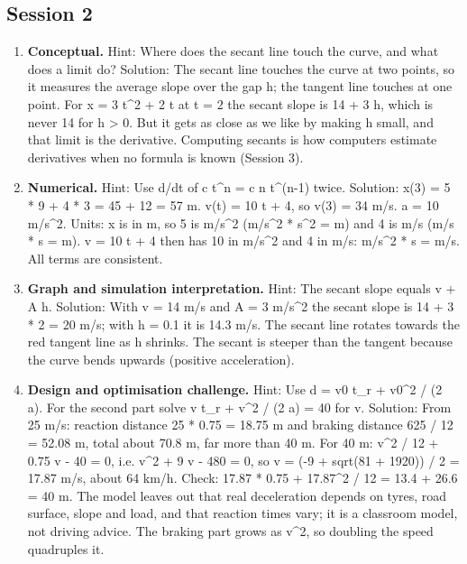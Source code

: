 \documentclass[11pt,a4paper]{article}
\begin{document}
\subsection*{Session 2}
\begin{enumerate}[nosep]
\item \textbf{Conceptual.} Hint: Where does the secant line touch the curve, and what does a limit do? Solution: The secant line touches the curve at two points, so it measures the average slope over the gap h; the tangent line touches at one point. For x = 3 t\textasciicircum{}2 + 2 t at t = 2 the secant slope is 14 + 3 h, which is never 14 for h \textgreater{} 0. But it gets as close as we like by making h small, and that limit is the derivative. Computing secants is how computers estimate derivatives when no formula is known (Session 3).
\item \textbf{Numerical.} Hint: Use d/dt of c t\textasciicircum{}n = c n t\textasciicircum{}(n-1) twice. Solution: x(3) = 5 * 9 + 4 * 3 = 45 + 12 = 57 m. v(t) = 10 t + 4, so v(3) = 34 m/s. a = 10 m/s\textasciicircum{}2. Units: x is in m, so 5 is m/s\textasciicircum{}2 (m/s\textasciicircum{}2 * s\textasciicircum{}2 = m) and 4 is m/s (m/s * s = m). v = 10 t + 4 then has 10 in m/s\textasciicircum{}2 and 4 in m/s: m/s\textasciicircum{}2 * s = m/s. All terms are consistent.
\item \textbf{Graph and simulation interpretation.} Hint: The secant slope equals v + A h. Solution: With v = 14 m/s and A = 3 m/s\textasciicircum{}2 the secant slope is 14 + 3 * 2 = 20 m/s; with h = 0.1 it is 14.3 m/s. The secant line rotates towards the red tangent line as h shrinks. The secant is steeper than the tangent because the curve bends upwards (positive acceleration).
\item \textbf{Design and optimisation challenge.} Hint: Use d = v0 t\_r + v0\textasciicircum{}2 / (2 a). For the second part solve v t\_r + v\textasciicircum{}2 / (2 a) = 40 for v. Solution: From 25 m/s: reaction distance 25 * 0.75 = 18.75 m and braking distance 625 / 12 = 52.08 m, total about 70.8 m, far more than 40 m. For 40 m: v\textasciicircum{}2 / 12 + 0.75 v - 40 = 0, i.e. v\textasciicircum{}2 + 9 v - 480 = 0, so v = (-9 + sqrt(81 + 1920)) / 2 = 17.87 m/s, about 64 km/h. Check: 17.87 * 0.75 + 17.87\textasciicircum{}2 / 12 = 13.4 + 26.6 = 40 m. The model leaves out that real deceleration depends on tyres, road surface, slope and load, and that reaction times vary; it is a classroom model, not driving advice. The braking part grows as v\textasciicircum{}2, so doubling the speed quadruples it.
\end{enumerate}
\end{document}
